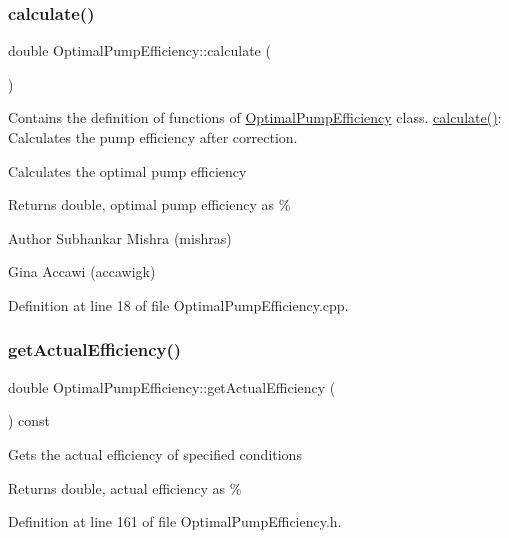 \subsubsection{\texorpdfstring{calculate()}{calculate()}}
{\footnotesize\ttfamily double Optimal\+Pump\+Efficiency\+::calculate (\begin{DoxyParamCaption}{ }\end{DoxyParamCaption})}



Contains the definition of functions of \hyperlink{class_optimal_pump_efficiency}{Optimal\+Pump\+Efficiency} class. \hyperlink{class_optimal_pump_efficiency_ac40720d1fcdf40d8b364df37e58e7f4d}{calculate()}\+: Calculates the pump efficiency after correction. 

Calculates the optimal pump efficiency \begin{DoxyReturn}{Returns}
double, optimal pump efficiency as \%
\end{DoxyReturn}
\begin{DoxyAuthor}{Author}
Subhankar Mishra (mishras) 

Gina Accawi (accawigk) 
\end{DoxyAuthor}


Definition at line 18 of file Optimal\+Pump\+Efficiency.\+cpp.

\mbox{\label{class_optimal_pump_efficiency_aa2ac8a7c61bc28f82e30cb44b9c21008}} 
\subsubsection{\texorpdfstring{get\+Actual\+Efficiency()}{getActualEfficiency()}}
{\footnotesize\ttfamily double Optimal\+Pump\+Efficiency\+::get\+Actual\+Efficiency (\begin{DoxyParamCaption}{ }\end{DoxyParamCaption}) const\hspace{0.3cm}{\ttfamily [inline]}}

Gets the actual efficiency of specified conditions \begin{DoxyReturn}{Returns}
double, actual efficiency as \% 
\end{DoxyReturn}


Definition at line 161 of file Optimal\+Pump\+Efficiency.\+h.

